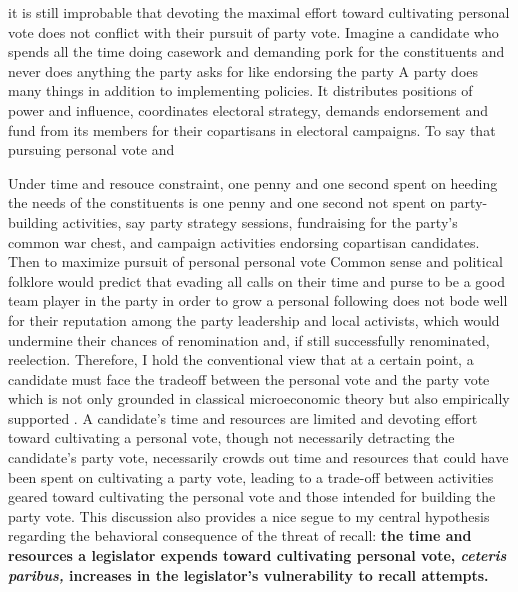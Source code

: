 \documentclass[hyphens, crop=false]{standalone}
\begin{document}
		
		it is still improbable that devoting the maximal effort toward cultivating personal vote does not conflict with their pursuit of party vote.
		Imagine a candidate who spends all the time doing casework and demanding pork for
		the constituents
		and never
		does anything
		the party asks for
		like endorsing the party
		A party does many things in addition to implementing policies.
		It
		distributes positions of power and influence,
		coordinates electoral strategy,
		demands endorsement and fund from its members
		for their copartisans in electoral campaigns.
		To say that pursuing personal vote and 
		
		Under time and resouce constraint,
		one penny and one second spent on heeding the needs of the constituents is one penny and one second not spent on party-building activities,
		say party strategy sessions,
		fundraising for the party's common war chest,
		and campaign activities endorsing copartisan candidates.
		Then to maximize pursuit of personal personal vote
		Common sense and political folklore would predict that evading all calls on their time and purse to be a good team player in the party in order to grow a personal following does not bode well for their reputation among the party leadership and local activists,
		which would undermine their chances of renomination and,
		if still successfully renominated,
		reelection.
		Therefore,
		I hold the conventional view that at a certain point,
		a candidate must face the tradeoff between the personal vote and the party vote which is not only grounded in classical microeconomic theory but also empirically supported
		\autocite{ansolabehereOldVotersNew2000,primoPartyStrengthPersonal2010}.
		A candidate's time and resources are limited and devoting effort toward cultivating a personal vote,
		though not necessarily detracting the candidate's party vote,
		necessarily crowds out time and resources that could have been spent on cultivating a party vote,
		leading to a trade-off between activities geared toward cultivating the personal vote and those intended for building the party vote.
		This discussion also provides a nice segue to my central hypothesis regarding the behavioral consequence of the threat of recall: 
		\textbf{the time and resources a legislator expends toward cultivating personal vote,
			\textit{ceteris paribus,}
			increases in the legislator's vulnerability to recall attempts.}
		
	
	
\end{document}
